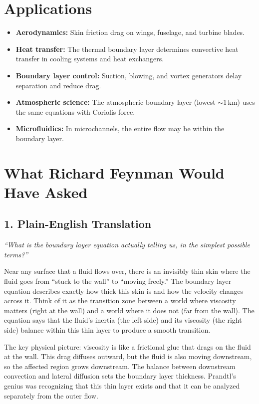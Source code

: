 \documentclass[11pt,openright]{book}
\begin{document}
\section*{Applications}

\begin{itemize}
\item \textbf{Aerodynamics:} Skin friction drag on wings, fuselage, and turbine blades.
\item \textbf{Heat transfer:} The thermal boundary layer determines convective heat transfer in cooling systems and heat exchangers.
\item \textbf{Boundary layer control:} Suction, blowing, and vortex generators delay separation and reduce drag.
\item \textbf{Atmospheric science:} The atmospheric boundary layer (lowest $\sim$1\,km) uses the same equations with Coriolis force.
\item \textbf{Microfluidics:} In microchannels, the entire flow may be within the boundary layer.
\end{itemize}
\section*{What Richard Feynman Would Have Asked}

\subsection*{1. Plain-English Translation}
\textit{``What is the boundary layer equation actually telling us, in the simplest possible terms?''}

Near any surface that a fluid flows over, there is an invisibly thin skin where the fluid goes from ``stuck to the wall'' to ``moving freely.'' The boundary layer equation describes exactly how thick this skin is and how the velocity changes across it. Think of it as the transition zone between a world where viscosity matters (right at the wall) and a world where it does not (far from the wall). The equation says that the fluid's inertia (the left side) and its viscosity (the right side) balance within this thin layer to produce a smooth transition.

The key physical picture: viscosity is like a frictional glue that drags on the fluid at the wall. This drag diffuses outward, but the fluid is also moving downstream, so the affected region grows downstream. The balance between downstream convection and lateral diffusion sets the boundary layer thickness. Prandtl's genius was recognizing that this thin layer exists and that it can be analyzed separately from the outer flow.
\end{document}
